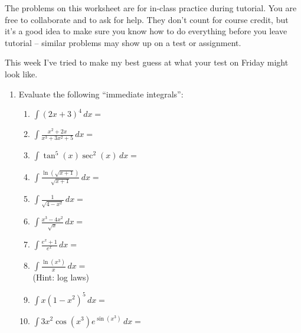 \documentclass[12pt]{article}
\newcommand{\di}{\displaystyle}
\begin{document}
\thispagestyle{fancy}
The problems on this worksheet are for in-class practice during tutorial. You are free to collaborate and to ask for help. They don't count for course credit, but it's a good idea to make sure you know how to do everything before you leave tutorial -- similar problems may show up on a test or assignment.

\bigskip

This week I've tried to make my best guess at what your test on Friday might look like.

\begin{enumerate}
 \item Evaluate the following ``immediate integrals'':

\begin{enumerate}
 \item $\di \int (2x+3)^4\,dx = $

\bigskip

 \item $\di \int \frac{x^2+2x}{x^3+3x^2+5}\,dx = $

\bigskip

 \item $\di \int \tan^5(x)\sec^2(x)\,dx = $

\bigskip

 \item $\di \int \frac{\ln(\sqrt{x+1})}{\sqrt{x+1}}\,dx = $

\bigskip

 \item $\di \int \frac{1}{\sqrt{4-x^2}}\,dx = $

\bigskip

 \item $\di \int \frac{x^3-4x^2}{\sqrt{x}}\,dx = $

\bigskip

 \item $\di \int \frac{e^x+1}{e^x}\,dx = $

\bigskip

 \item $\di \int \frac{\ln(x^3)}{x}\,dx = $ \\(Hint: log laws)

\bigskip

 \item $\di \int x(1-x^2)^5\,dx = $

\bigskip

 \item $\di \int 3x^2\cos(x^3)e^{\sin(x^3)}\,dx = $
\end{enumerate}


\end{enumerate}
\end{document}
